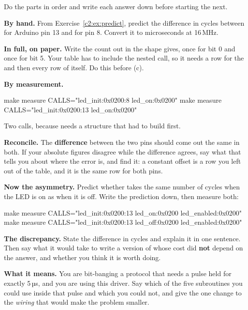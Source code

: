 Do the parts in order and write each answer down before starting the next.
\begin{parts}
  \item \textbf{By hand.} From Exercise~\ref{c2:ex:predict}, predict the difference in cycles
    between  for Arduino pin 13 and  for pin 8. Convert it to
    microseconds at 16\,MHz.
  \item \textbf{In full, on paper.} Write the count out in the shape  gives,
    once for bit 0 and once for bit 5. Your table has to include the nested call, so it needs a row
    for the  and then every row of  itself. Do this before (c).
  \item \textbf{By measurement.}
\begin{shell}
make measure CALLS="led_init:0x0200:8 led_on:0x0200"
make measure CALLS="led_init:0x0200:13 led_on:0x0200"
\end{shell}
    Two calls, because  needs a structure that  had to build first.
  \item \textbf{Reconcile.} The \textbf{difference} between the two pins should come out the same
    in both. If your absolute figures disagree while the difference agrees, say what that tells you
    about where the error is, and find it: a constant offset is a row you left out of the table,
    and it is the same row for both pins.
  \item \textbf{Now the asymmetry.} Predict whether  takes the same number of
    cycles when the LED is on as when it is off. Write the prediction down, then measure both:
\begin{shell}
make measure CALLS="led_init:0x0200:13 led_on:0x0200 led_enabled:0x0200"
make measure CALLS="led_init:0x0200:13 led_off:0x0200 led_enabled:0x0200"
\end{shell}
  \item \textbf{The discrepancy.} State the difference in cycles and explain it in one sentence.
    Then say what it would take to write a version of  whose cost did
    \textbf{not} depend on the answer, and whether you think it is worth doing.
  \item \textbf{What it means.} You are bit-banging a protocol that needs a pulse held for exactly
    5\,µs, and you are using this driver. Say which of the five subroutines you could use inside
    that pulse and which you could not, and give the one change to the \emph{wiring} that would
    make the problem smaller.
\end{parts}

